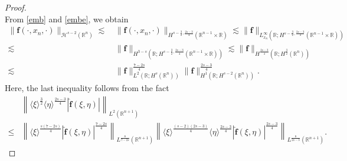 \documentclass[preprint,compress,12pt]{elsarticle}
\numberwithin{equation}{section}
\begin{document}
\begin{proof}
\begin{equation}
	\end{equation}
	From \eqref{emb} and \eqref{embe}, we obtain
	\begin{equation}\label{fallacious}	
		\begin{aligned}	\|\boldsymbol{f}(\cdot,x_{n},\cdot)\|_{\mathcal{H}^{s-2}(\mathbb{R}^{n})}\lesssim&\,\|\boldsymbol{f}(\cdot,x_{n},\cdot)\|_{H^{s-\frac{3}{2},\frac{2s-3}{4}}(\mathbb{R}^{n-1}\times\mathbb{R})}\lesssim\|\boldsymbol{f}\|_{L_{x_{n}}^{\infty}(\mathbb{R};H^{s-\frac{3}{2},\frac{2s-3}{4}}(\mathbb{R}^{n-1}\times\mathbb{R}))}\\ \lesssim&\,\|\boldsymbol{f}\|_{H^{3-s}(\mathbb{R};H^{s-\frac{3}{2},\frac{2s-3}{4}}(\mathbb{R}^{n-1}\times\mathbb{R}))}\lesssim\|\boldsymbol{f}\|_{H^{\frac{2s-3}{4}}(\mathbb{R};H^{\frac{3}{2}}(\mathbb{R}^{n}))}\\			\lesssim&\,\|\boldsymbol{f}\|_{L^{2}(\mathbb{R};H^{s}(\mathbb{R}^{n}))}^{\frac{7-2s}{4}}\|\boldsymbol{f}\|_{H^{1}(\mathbb{R};H^{s-2}(\mathbb{R}^{n}))}^{\frac{2s-3}{4}}.
		\end{aligned}
	\end{equation}
	Here, the last inequality follows from the fact
	\begin{equation*}
		\begin{aligned}
			&\left\|\langle\xi\rangle^{\frac{3}{2}} \langle\eta\rangle^{\frac{2s-3}{4}} |\widehat{\boldsymbol{f}}(\xi,\eta)|\right\|_{L^{2}(\mathbb{R}^{n+1})}\\
			\leq&\left\|\langle\xi\rangle^{\frac{s(7-2s)}{4}} |\widehat{\boldsymbol{f}}(\xi,\eta)|^{\frac{7-2s}{4}}\right\|_{L^{\frac{8}{7-2s}}(\mathbb{R}^{n+1})}  \left\|\langle\xi\rangle^{\frac{(s-2)(2s-3)}{4}}\langle\eta\rangle^{\frac{2s-3}{4}} |\widehat{\boldsymbol{f}}(\xi,\eta)|^{\frac{2s-3}{4}}\right\|_{L^{\frac{8}{2s-3}}(\mathbb{R}^{n+1})}.
		\end{aligned}
	\end{equation*}
	

\end{proof}
\end{document}
